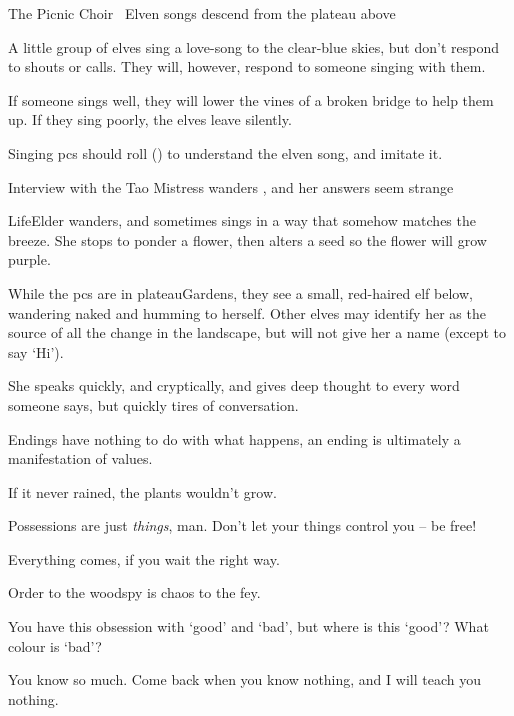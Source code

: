 
{The Picnic Choir}%
{~Elven songs descend from the plateau above}%

A little group of elves sing a love-song to the clear-blue skies, but don't respond to shouts or calls.
They will, however, respond to someone singing with them.

If someone sings well, they will lower the vines of a broken bridge to help them up.
If they sing poorly, the elves leave silently.

Singing \glspl{pc} should roll  (\tn[10]) to understand the elven song, and imitate it.

{Interview with the Tao Mistress}%
{ wanders , and her answers seem strange}%

\Gls{LifeElder} wanders, and sometimes sings in a way that somehow matches the breeze.
She stops to ponder a flower, then alters a seed so the flower will grow purple.

While the \glspl{pc} are in \gls{plateauGardens}, they see a small, red-haired elf below, wandering naked and humming to herself.
Other elves may identify her as the source of all the change in the landscape, but will not give her a name (except to say `Hi').

She speaks quickly, and cryptically, and gives deep thought to every word someone says, but quickly tires of conversation.

\begin{speechtext}
  Endings have nothing to do with what happens, an ending is ultimately a manifestation of values.

  If it never rained, the plants wouldn't grow.

  Possessions are just \emph{things}, man.
  Don't let your things control you -- be free!

  Everything comes, if you wait the right way.

  Order to the \gls{woodspy} is chaos to the fey.

  You have this obsession with `good' and `bad', but where is this `good'?
  What colour is `bad'?

  You know so much.
  Come back when you know nothing, and I will teach you nothing.

\end{speechtext}

